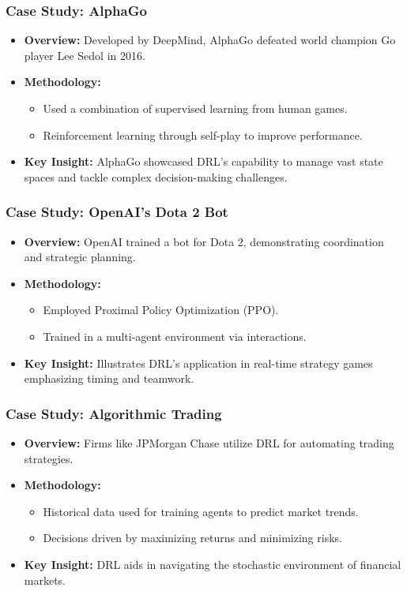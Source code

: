 \documentclass[aspectratio=169]{beamer}
\begin{document}
\begin{frame}[fragile]
    \frametitle{Case Study: AlphaGo}
    \begin{itemize}
        \item \textbf{Overview:} Developed by DeepMind, AlphaGo defeated world champion Go player Lee Sedol in 2016.
        \item \textbf{Methodology:} 
            \begin{itemize}
                \item Used a combination of supervised learning from human games.
                \item Reinforcement learning through self-play to improve performance.
            \end{itemize}
        \item \textbf{Key Insight:} 
            AlphaGo showcased DRL's capability to manage vast state spaces and tackle complex decision-making challenges.
    \end{itemize}
\end{frame}

\begin{frame}[fragile]
    \frametitle{Case Study: OpenAI’s Dota 2 Bot}
    \begin{itemize}
        \item \textbf{Overview:} OpenAI trained a bot for Dota 2, demonstrating coordination and strategic planning.
        \item \textbf{Methodology:}
            \begin{itemize}
                \item Employed Proximal Policy Optimization (PPO).
                \item Trained in a multi-agent environment via interactions.
            \end{itemize}
        \item \textbf{Key Insight:} 
            Illustrates DRL's application in real-time strategy games emphasizing timing and teamwork.
    \end{itemize}
\end{frame}

\begin{frame}[fragile]
    \frametitle{Case Study: Algorithmic Trading}
    \begin{itemize}
        \item \textbf{Overview:} Firms like JPMorgan Chase utilize DRL for automating trading strategies.
        \item \textbf{Methodology:}
            \begin{itemize}
                \item Historical data used for training agents to predict market trends.
                \item Decisions driven by maximizing returns and minimizing risks.
            \end{itemize}
        \item \textbf{Key Insight:} 
            DRL aids in navigating the stochastic environment of financial markets.
    \end{itemize}
\end{frame}
\end{document}
